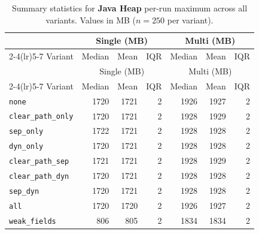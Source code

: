 \begin{longtable}{l rrr rrr}
\caption[Java heap summary statistics]{Summary statistics for \textbf{Java Heap} per-run maximum across all variants. Values in MB ($n=250$ per variant).}\label{tab:stats-memory-java-heap} \\
\toprule
 & \multicolumn{3}{c}{Single (MB)} & \multicolumn{3}{c}{Multi (MB)} \\
\cmidrule(lr){2-4}\cmidrule(lr){5-7}
Variant & Median & Mean & IQR & Median & Mean & IQR \\
\midrule
\endfirsthead
\toprule
 & \multicolumn{3}{c}{Single (MB)} & \multicolumn{3}{c}{Multi (MB)} \\
\cmidrule(lr){2-4}\cmidrule(lr){5-7}
Variant & Median & Mean & IQR & Median & Mean & IQR \\
\midrule
\endhead
\bottomrule
\endfoot
\texttt{none} & 1720 & 1721 & 2 & 1926 & 1927 & 2 \\
\texttt{clear\_path\_only} & 1720 & 1721 & 2 & 1928 & 1929 & 2 \\
\texttt{sep\_only} & 1722 & 1721 & 2 & 1928 & 1928 & 2 \\
\texttt{dyn\_only} & 1720 & 1721 & 2 & 1928 & 1928 & 2 \\
\texttt{clear\_path\_sep} & 1721 & 1721 & 2 & 1928 & 1929 & 2 \\
\texttt{clear\_path\_dyn} & 1720 & 1721 & 2 & 1928 & 1928 & 2 \\
\texttt{sep\_dyn} & 1720 & 1721 & 2 & 1928 & 1928 & 2 \\
\texttt{all} & 1720 & 1720 & 2 & 1926 & 1927 & 2 \\
\texttt{weak\_fields} & 806 & 805 & 2 & 1834 & 1834 & 2 \\
\end{longtable}
